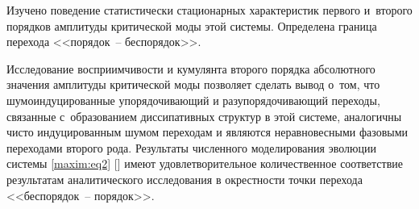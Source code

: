 Изучено поведение статистически стационарных характеристик первого и~второго порядков амплитуды критической моды этой системы. Определена граница перехода <<порядок~-- беспорядок>>. 

Исследование восприимчивости и кумулянта второго порядка абсолютного значения амплитуды критической моды позволяет сделать вывод о~том, что шумоиндуцированные упорядочивающий и разупорядочивающий переходы, связанные с~образованием диссипативных структур в этой системе, аналогичны чисто индуцированным шумом переходам и являются неравновесными фазовыми переходами второго рода. Результаты численного моделирования эволюции системы \eqref{maxim:eq2} [] имеют удовлетворительное количественное соответствие результатам аналитического исследования в окрестности точки перехода <<беспорядок~-- порядок>>.





